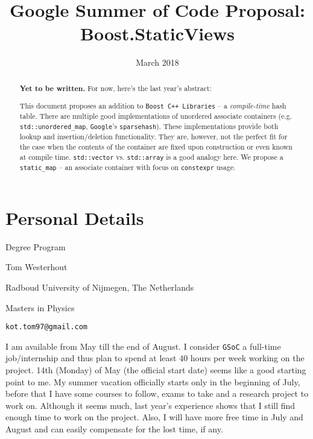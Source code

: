 \documentclass[a4paper,12pt]{article}
\title{Google Summer of Code Proposal: Boost.StaticViews}
\date{March 2018}
\begin{document}
\maketitle

\begin{abstract}
    \textbf{Yet to be written.} For now, here's the last year's abstract:

    This document proposes an addition to \texttt{Boost C++ Libraries} -- a
    \textit{compile-time} hash table. There are multiple good implementations of
    unordered associate containers (e.g. \texttt{std::unordered\_map},
    \texttt{Google}'s \texttt{sparsehash}). These implementations provide both
    lookup and insertion/deletion functionality. They are, however, not the
    perfect fit for the case when the contents of the container are fixed upon
    construction or even known at compile time. \texttt{std::vector} vs.
    \texttt{std::array} is a good analogy here. We propose a
    \texttt{static\_map} -- an associate container with focus on
    \texttt{constexpr} usage.
\end{abstract}

\section{Personal Details}
    \begin{labeling}{Degree Program}
    \item [Name] Tom Westerhout
    \item [University] Radboud University of Nijmegen, The Netherlands
    \item [Degree Program] Masters in Physics
    \item [Email] \texttt{kot.tom97@gmail.com}
    \item [Availability] I am available from May till the end of August. I
        consider \texttt{GSoC} a full-time job/internship and thus plan to spend
        at least 40 hours per week working on the project. 14th (Monday) of May
        (the official start date) seems like a good starting point to me. My
        summer vacation officially starts only in the beginning of July, before
        that I have some courses to follow, exams to take and a research project
        to work on. Although it seems much, last year's experience shows that I
        still find enough time to work on the project. Also, I will have more
        free time in July and August and can easily compensate for the lost
        time, if any.
    \end{labeling}
\end{document}
